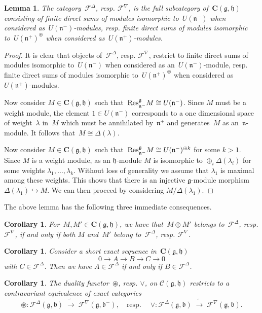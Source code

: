 \documentclass[11pt]{amsart}
\newcommand{\cF}{{\mathcal{F}}}
\newcommand{\bC}{\mathbf{C}}
\newcommand{\cC}{\mathcal{C}}
\newcommand{\fn}{\mathfrak{n}}
\newcommand{\fg}{\mathfrak{g}}
\newcommand{\fh}{\mathfrak{h}}
\newcommand{\fb}{\mathfrak{b}}
\numberwithin{equation}{section}
\theoremstyle{plain}
\newtheorem{lemma}[subsubsection]{Lemma}
\newtheorem{cor}[subsubsection]{Corollary}
\theoremstyle{remark}
\theoremstyle{remark}
\theoremstyle{construction}
\newcommand{\res}{{\rm Res}}
\begin{document}
\begin{lemma}\label{stupidlemma}
The category~$\cF^{\Delta}$, resp. $\cF^{\nabla}$, is the full subcategory of~$\bC(\fg,\fh)$ consisting of finite direct sums of modules isomorphic to~$U(\fn^-)$ when considered as~$U(\fn^-)$-modules, resp. finite direct sums of modules isomorphic to~$U(\fn^+)^{\circledast}$ when considered as~$U(\fn^+)$-modules.
\end{lemma}
\begin{proof}
It is clear that objects {of}~$\cF^{\Delta}$, resp. $\cF^{\nabla}$, restrict to finite direct sums of modules isomorphic to~$U(\fn^-)$ when considered as an~$U(\fn^-)$-module, resp. finite direct sums of modules isomorphic to~$U(\fn^+)^{\circledast}$ when considered as $U(\fn^+)$-module{s}.


Now consider $M\in \bC(\fg,\fh)$ such that~$\res^{\fg}_{\fn^-}M\cong U(\fn^-)$. Since $M$ must be a weight module, the element $1\in U(\fn^-)$ corresponds to a one dimensional space of weight~$\lambda$ in~$M$ which must be annihilated by~$\fn^+$ and generates~$M$ as an~$\fn$-module. It follows that~$M\cong {\Delta}(\lambda)$.


Now consider $M\in \bC(\fg,\fh)$ such that~$\res^{\fg}_{\fn^-}M\cong U(\fn^-)^{\oplus k}$ for some $k>1$. Since $M$ is a weight module, as an $\fh$-module $M$ is isomorphic to $\oplus_i {\Delta}(\lambda_i)$ for some weights $\lambda_1,\ldots,\lambda_k$. Without loss of generality we assume that $\lambda_1$ is maximal among these weights. This shows that there is an injective $\fg$-module morphism ${\Delta}(\lambda_1)\hookrightarrow M$. We can then proceed by considering $M/{\Delta}(\lambda_1)$.
\end{proof}


The above lemma has the following three immediate consequences.
\begin{cor}\label{CorAdd}
For~$M,M'\in \bC(\fg,\fh)$, we have that~$M\oplus M'$ belongs to~$\cF^{\Delta}$, resp. $\cF^{\nabla}$, if and only if both $M$ and~$M'$ belong to~$\cF^{\Delta}$, resp. $\cF^{\nabla}$. 
\end{cor}


\begin{cor}\label{resolv}
Consider a short exact sequence in~$\bC(\fg,\fh)$
$$0\to A\to B\to C\to 0$$
with $C\in \cF^{\Delta}$. Then we have $A\in \cF^{\Delta}$ if and only if $B\in\cF^{\Delta}$.
\end{cor}




\begin{cor}\label{CorDua}
The duality functor~$\circledast$, resp. $\vee$, on $\cC(\fg,\fh)$ restricts to a contravariant equivalence of exact categories
$$\circledast: \cF^\Delta({\fg,\fb})\;\tilde\to\; \cF^\nabla({\fg,\fb^-}),\quad\mbox{resp.}\quad\; \vee : \cF^{\Delta}(\fg,\fb)\;\tilde\to\; \cF^{\nabla}(\fg,\fb).$$
\end{cor}
\end{document}
